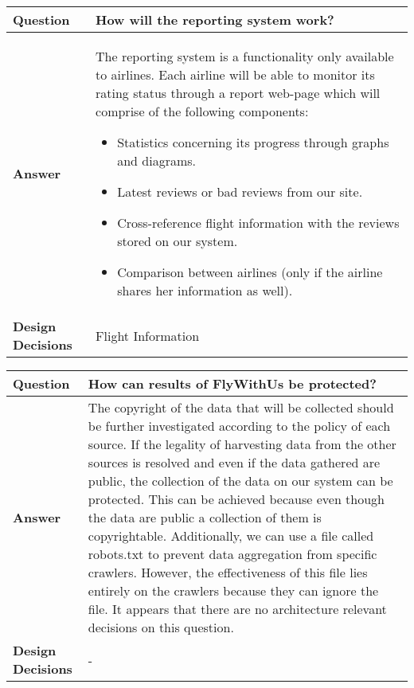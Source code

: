 \clearpage

\begin{longtable}{| l |  p{12cm} |}
\hline
\textbf{Question} & \textbf{How will the reporting system work?} \\ \hline
\textbf{Answer} &
	The reporting system is a functionality only available to airlines. Each airline will be able to monitor its rating status through a report web-page which will comprise of the following components:
	\begin{itemize}
	\item Statistics concerning its progress through graphs and diagrams.
	\item Latest reviews or bad reviews from our site.
	\item Cross-reference flight information with the reviews stored on our system.
	\item Comparison between airlines (only if the airline shares her information as well).
	\end{itemize}
 \\ \hline
\textbf{Design Decisions} & Flight Information \\ \hline
\end{longtable}

\begin{longtable}{| l |  p{12cm} |}
\hline
\textbf{Question} & \textbf{How can results of FlyWithUs be protected?} \\ \hline
\textbf{Answer} &
	The copyright of the data that will be collected should be further investigated according to the policy of each source. If the legality of harvesting data from the other sources is resolved and even if the data gathered are public, the collection of the data on our system can be protected. This can be achieved because even though the data are public a collection of them is copyrightable. Additionally, we can use a file called robots.txt to prevent data aggregation from specific crawlers. However, the effectiveness of this file lies entirely on the crawlers because they can ignore the file. It appears that there are no architecture relevant decisions on this question.
 \\ \hline
\textbf{Design Decisions} & - \\ \hline
\end{longtable}

